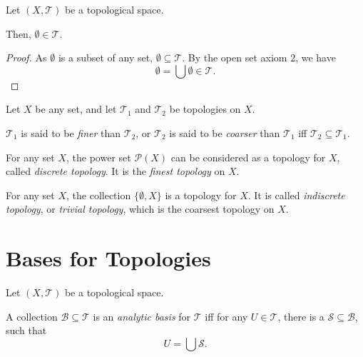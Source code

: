 \documentclass{report}
\begin{document}
\begin{lemma}
	\label{lm: emptyset is in topology}
	
	Let $(X, \mathcal T)$ be a topological space.
	
	Then, $\emptyset \in \mathcal T$.
\end{lemma}


\begin{proof}
	As $\emptyset$ is a subset of any set, $\emptyset \subseteq \mathcal T$. By the open set axiom 2, we have
	$$
	\emptyset = \bigcup \emptyset \in \mathcal T.
	$$
\end{proof}


\begin{definition}
	Let $X$ be any set, and let $\mathcal T_1$ and $\mathcal T_2$ be topologies on $X$.
	
	$\mathcal T_1$ is said to be \textit{finer} than $\mathcal T_2$, or $\mathcal T_2$ is said to be \textit{coarser} than $\mathcal T_1$ iff $\mathcal T_2 \subseteq \mathcal T_1$.
\end{definition}


\begin{example}
	For any set $X$, the power set $\mathcal P(X)$ can be considered as a topology for $X$, called \textit{discrete topology}. It is the \textit{finest topology} on $X$.
\end{example}

\begin{example}
	For any set $X$, the collection $\{\emptyset, X\}$ is a topology for $X$. It is called \textit{indiscrete topology}, or \textit{trivial topology}, which is the coarsest topology on $X$.
\end{example}


\section{Bases for Topologies}


\begin{definition}
	Let $(X, \mathcal T)$ be a topological space.
	
	A collection $\mathcal B \subseteq \mathcal T$ is an \textit{analytic basis} for $\mathcal T$ iff for any $U \in \mathcal T$, there is a $\mathcal S \subseteq \mathcal B$, such that
	$$
	U = \bigcup \mathcal S.
	$$
\end{definition}














\end{document}
